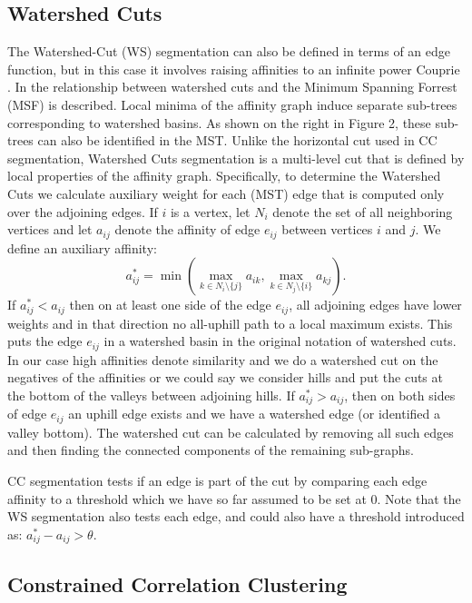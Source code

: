 \documentclass[letterpaper,twocolumn,fleqn]{article}
\begin{document}
\subsection{Watershed Cuts}
\label{subsec:ws}
The Watershed-Cut (WS) segmentation can also be defined in terms of an edge function, but in this case it involves raising affinities to an infinite power Couprie \cite{Couprie2011}. In \cite{Cousty2009} the relationship between watershed cuts and the Minimum Spanning Forrest (MSF) is described. Local minima of the affinity graph induce separate sub-trees corresponding to watershed basins. As shown on the right in Figure 2, these sub-trees can also be identified in the MST. Unlike the horizontal cut used in CC segmentation, Watershed Cuts segmentation is a multi-level cut that is defined by local properties of the affinity graph. Specifically, to determine the Watershed Cuts we calculate auxiliary weight for each (MST) edge that is computed only over the adjoining edges. If $i$ is a vertex, let $N_i$ denote the set of all neighboring vertices and let $a_{ij}$ denote the affinity of edge $e_{ij}$ between vertices $i$ and $j$. We define an  auxiliary affinity:
\begin{equation}\label{eq:LocalMinMax}
a_{ij}^*=\min\left( \max_{k\in N_i\setminus\{j\}}a_{ik},\max_{k\in N_j\setminus\{i\}}a_{kj}\right).
\end{equation}
If $a_{ij}^*<a_{ij}$ then on at least one side of the edge $e_{ij}$, all adjoining edges have lower weights and in that direction no all-uphill path to a local maximum exists. This puts the edge $e_{ij}$ in a watershed basin in the original notation of watershed cuts. In our case high affinities denote similarity and we do a watershed cut on the negatives of the affinities or we could say we consider hills and put the cuts at the bottom of the valleys between adjoining hills.
If $a_{ij}^*> a_{ij}$, then on both sides of edge $e_{ij}$ an uphill edge exists and we have a watershed edge (or identified a valley bottom). The watershed cut can be calculated by removing all such edges and then finding the connected components of the remaining sub-graphs. 

CC segmentation tests if an edge is part of the cut by comparing each edge affinity to a threshold which we have so far assumed to be set at 0. Note that the WS segmentation also tests each edge, and could also have a threshold introduced as: $a_{ij}^* - a_{ij} > \theta$.  

\subsection{Constrained Correlation Clustering}
\label{subsec:ccc}
\end{document}
